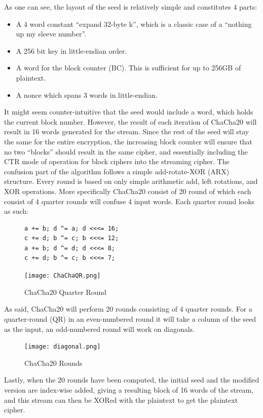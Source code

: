 \documentclass[a4paper]{article}
\begin{document}
As one can see, the layout of the seed is relatively simple and constitutes 4 parts:
\begin{itemize}
\item A 4 word constant ``expand 32-byte k'', which is a classic case of a ``nothing up my sleeve number''.
\item A 256 bit key in little-endian order.
\item A word for the block counter (BC). This is sufficient for up to 256GB of plaintext.
\item A nonce which spans 3 words in little-endian.
\end{itemize}
It might seem counter-intuitive that the seed would include a word, which holds the current block number. However, the result of each iteration of ChaCha20 will result in 16 words generated for the stream. Since the rest of the seed will stay the same for the entire encryption, the increasing block counter will ensure that no two ``blocks'' should result in the same cipher, and essentially including the CTR mode of operation for block ciphers into the streaming cipher. The confusion part of the algorithm follows a simple add-rotate-XOR (ARX) structure. Every round is based on only simple arithmetic add, left rotations, and XOR operations. More specifically ChaCha20 consist of 20 round of which each consist of 4 quarter rounds will confuse 4 input words. Each quarter round looks as such:
\begin{figure}[H]
\begin{minipage}{0.4\textwidth}
\begin{verbatim}
a += b; d ^= a; d <<<= 16;
c += d; b ^= c; b <<<= 12;
a += b; d ^= d; d <<<= 8;
c += d; b ^= c; b <<<= 7;
\end{verbatim}
\end{minipage}
\qquad
\begin{minipage}{0.4\textwidth}
\texttt{[image: ChaChaQR.png]}
\end{minipage}
\caption{ChaCha20 Quarter Round}
\label{fig:ChaChaQR}
\end{figure}
As said, ChaCha20 will perform 20 rounds consisting of 4 quarter rounds. For a quarter-round (QR) in an even-numbered round it will take a column of the seed as the input, an odd-numbered round will work on diagonals.
\begin{figure}[H]
\centering
\texttt{[image: diagonal.png]}
\caption{ChaCha20 Rounds}
\label{fig:ChaChaRound}
\end{figure}

Lastly, when the 20 rounds have been computed, the initial seed and the modified version are index-wise added, giving a resulting block of 16 words of the stream, and this stream can then be XORed with the plaintext to get the plaintext cipher.
\end{document}
